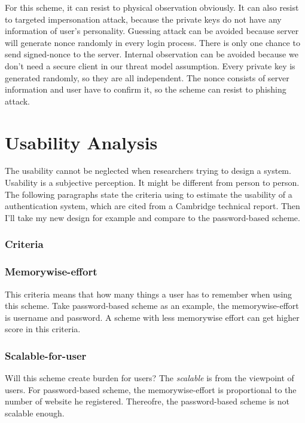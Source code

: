 \begin{CJK}{Bg5}{bsmi}
For this scheme, it can resist to physical observation obviously. It can also resist to targeted impersonation attack, because the private keys do not have any information of user's personality. Guessing attack can be avoided because server will generate nonce randomly in every login process. There is only one chance to send signed-nonce to the server. Internal observation can be avoided because we don't need a secure client in our threat model assumption. Every private key is generated randomly, so they are all independent. The nonce consists of server information and user have to confirm it, so the scheme can resist to phishing attack.

\section{Usability Analysis}

The usability cannot be neglected when researchers trying to design a system. Usability is a subjective perception. It might be different from person to person.
The following paragraphs state the criteria using to estimate the usability of a authentication system, which are cited from a Cambridge technical report\cite{password-extended}. Then I'll take my new design for example and compare to the password-based scheme.

\subsubsection{Criteria}

\subsubsection{Memorywise-effort}

This criteria means that how many things a user has to remember when using this scheme. Take password-based scheme as an example, the memorywise-effort is username and password. A scheme with less memorywise effort can get higher score in this criteria.

\subsubsection{Scalable-for-user}

Will this scheme create burden for users? The \emph{scalable} is from the viewpoint of users. For password-based scheme, the memorywise-effort is proportional to the number of website he registered. Thereofre, the password-based scheme is not scalable enough.


\end{CJK}
